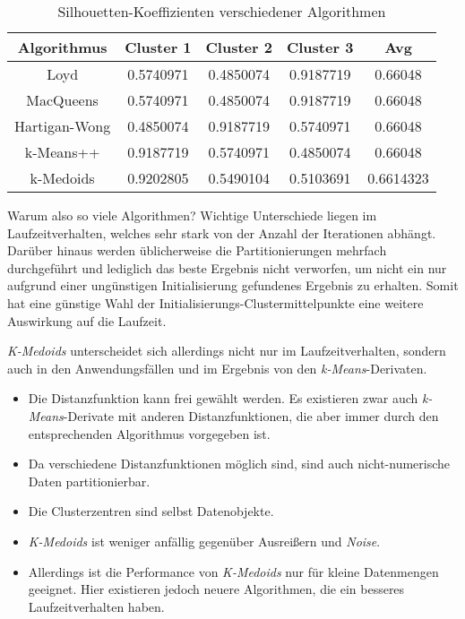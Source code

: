 \documentclass[a4paper,12pt,twoside]{article}
\newcommand{\Fachbegriff}[1]{\textit{#1}}
\begin{document}
\begin{table}
\centering
\begin{tabular}{|c|c|c|c|c|}
\hline 
Algorithmus & Cluster 1 & Cluster 2 & Cluster 3 & Avg \\ 
\hline 
Loyd & 0.5740971 & 0.4850074 & 0.9187719 & 0.66048 \\ 
\hline 
MacQueens & 0.5740971 & 0.4850074 & 0.9187719 & 0.66048 \\ 
\hline 
Hartigan-Wong & 0.4850074 & 0.9187719 & 0.5740971 & 0.66048 \\ 
\hline 
k-Means++ & 0.9187719 & 0.5740971 & 0.4850074  & 0.66048 \\ 
\hline 
k-Medoids & 0.9202805 & 0.5490104 & 0.5103691  & 0.6614323 \\ 
\hline 
\end{tabular}
  \caption{Silhouetten-Koeffizienten verschiedener Algorithmen}
  \label{tab:sil}
\end{table}

Warum also so viele Algorithmen? Wichtige Unterschiede liegen im Laufzeitverhalten, welches sehr stark von der Anzahl der Iterationen abhängt. Darüber hinaus werden üblicherweise die Partitionierungen mehrfach durchgeführt und lediglich das beste Ergebnis nicht verworfen, um nicht ein nur aufgrund einer ungünstigen Initialisierung gefundenes Ergebnis zu erhalten. Somit hat eine günstige Wahl der Initialisierungs-Clustermittelpunkte eine weitere Auswirkung auf die Laufzeit.

\Fachbegriff{K-Medoids} unterscheidet sich allerdings nicht nur im  Laufzeitverhalten, sondern auch in den Anwendungsfällen und im Ergebnis von den \Fachbegriff{k-Means}-Derivaten.

\begin{itemize}
\item Die Distanzfunktion kann frei gewählt werden. Es existieren zwar auch \Fachbegriff{k-Means}-Derivate mit anderen Distanzfunktionen, die aber immer durch den entsprechenden Algorithmus vorgegeben ist.
\item Da verschiedene Distanzfunktionen möglich sind, sind auch nicht-numerische Daten partitionierbar.
\item Die Clusterzentren sind selbst Datenobjekte.
\item \Fachbegriff{K-Medoids} ist weniger anfällig gegenüber Ausreißern und \Fachbegriff{Noise}.
\item Allerdings ist die Performance von \Fachbegriff{K-Medoids} nur für kleine Datenmengen geeignet. Hier existieren jedoch neuere Algorithmen, die ein besseres Laufzeitverhalten haben.
\end{itemize}

\pagebreak 
\printbibliography
\end{document}
